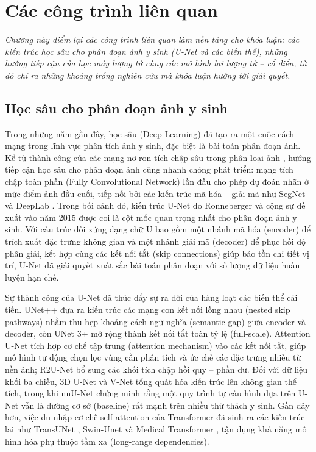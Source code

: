 \chapter{Các công trình liên quan}
\label{Chapter2}

\textit{Chương này điểm lại các công trình liên quan làm nền tảng cho khóa luận: các kiến trúc học sâu cho phân đoạn ảnh y sinh (U-Net và các biến thể), những hướng tiếp cận của học máy lượng tử cùng các mô hình lai lượng tử -- cổ điển, từ đó chỉ ra những khoảng trống nghiên cứu mà khóa luận hướng tới giải quyết.}

\section{Học sâu cho phân đoạn ảnh y sinh}
Trong những năm gần đây, học sâu (Deep Learning) \cite{lecun2015deeplearning} đã tạo ra một cuộc cách mạng trong lĩnh vực phân tích ảnh y sinh, đặc biệt là bài toán phân đoạn ảnh. Kể từ thành công của các mạng nơ-ron tích chập sâu trong phân loại ảnh \cite{krizhevsky2012alexnet, simonyan2015vgg, he2016resnet}, hướng tiếp cận học sâu cho phân đoạn ảnh cũng nhanh chóng phát triển: mạng tích chập toàn phần (Fully Convolutional Network) \cite{long2015fcn} lần đầu cho phép dự đoán nhãn ở mức điểm ảnh đầu-cuối, tiếp nối bởi các kiến trúc mã hóa -- giải mã như SegNet \cite{badrinarayanan2017segnet} và DeepLab \cite{chen2018deeplabv3plus}. Trong bối cảnh đó, kiến trúc U-Net do Ronneberger và cộng sự đề xuất vào năm 2015 \cite{ronneberger2015unet} được coi là cột mốc quan trọng nhất cho phân đoạn ảnh y sinh. Với cấu trúc đối xứng dạng chữ U bao gồm một nhánh mã hóa (encoder) để trích xuất đặc trưng không gian và một nhánh giải mã (decoder) để phục hồi độ phân giải, kết hợp cùng các kết nối tắt (skip connections) giúp bảo tồn chi tiết vị trí, U-Net đã giải quyết xuất sắc bài toán phân đoạn với số lượng dữ liệu huấn luyện hạn chế.

Sự thành công của U-Net đã thúc đẩy sự ra đời của hàng loạt các biến thể cải tiến. UNet++ \cite{zhou2018unetplusplus} đưa ra kiến trúc các mạng con kết nối lồng nhau (nested skip pathways) nhằm thu hẹp khoảng cách ngữ nghĩa (semantic gap) giữa encoder và decoder, còn UNet 3+ \cite{huang2020unet3plus} mở rộng thành kết nối tắt toàn tỷ lệ (full-scale). Attention U-Net \cite{oktay2018attention} tích hợp cơ chế tập trung (attention mechanism) vào các kết nối tắt, giúp mô hình tự động chọn lọc vùng cần phân tích và ức chế các đặc trưng nhiễu từ nền ảnh; R2U-Net \cite{alom2018r2unet} bổ sung các khối tích chập hồi quy -- phần dư. Đối với dữ liệu khối ba chiều, 3D U-Net \cite{cicek20163dunet} và V-Net \cite{milletari2016vnet} tổng quát hóa kiến trúc lên không gian thể tích, trong khi nnU-Net \cite{isensee2021nnunet} chứng minh rằng một quy trình tự cấu hình dựa trên U-Net vẫn là đường cơ sở (baseline) rất mạnh trên nhiều thử thách y sinh. Gần đây hơn, việc du nhập cơ chế self-attention của Transformer \cite{vaswani2017attention, dosovitskiy2021vit} đã sinh ra các kiến trúc lai như TransUNet \cite{chen2021transunet}, Swin-Unet \cite{cao2022swinunet} và Medical Transformer \cite{valanarasu2021medt}, tận dụng khả năng mô hình hóa phụ thuộc tầm xa (long-range dependencies).

